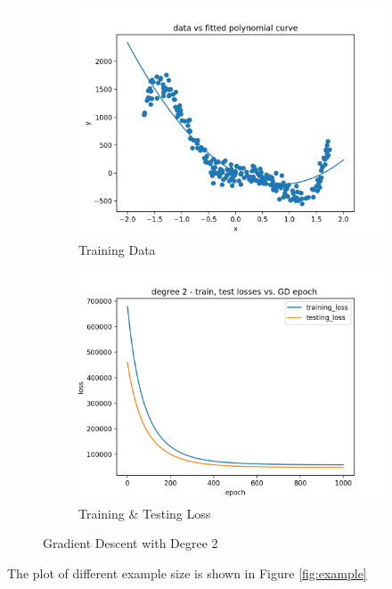 \documentclass[11pt]{article}
\begin{document}
\begin{enumerate}
\begin{figure}[!h]
  \centering
  \begin{subfigure}[b]{0.4\linewidth}
    \includegraphics[width=\linewidth]{figures/d2_gd_train.png}
    \caption{Training Data}
  \end{subfigure}
  \begin{subfigure}[b]{0.4\linewidth}
    \includegraphics[width=\linewidth]{figures/d2_gd_loss.png}
    \caption{Training \& Testing Loss}
  \end{subfigure}
  \caption{Gradient Descent with Degree 2}
  \label{fig:gd_2}
\end{figure}

The plot of different example size is shown in Figure \ref{fig:example}



\end{enumerate}
\end{document}
